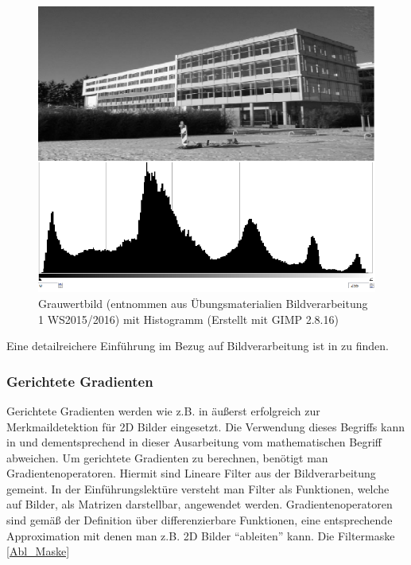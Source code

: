 \begin{figure}[thpb]
	\centering
	\includegraphics[width=\linewidth]{1-Einleitung/pics/pic_histo_uni01.png}
	\caption{Grauwertbild (entnommen aus Übungsmaterialien Bildverarbeitung 1 WS2015/2016) mit Histogramm (Erstellt mit GIMP 2.8.16)}
	\label{histo_pic}
\end{figure}



Eine detailreichere Einführung im Bezug auf Bildverarbeitung ist in \cite{Priese15} zu finden.

\subsubsection{Gerichtete Gradienten}
Gerichtete Gradienten werden wie z.B. in \cite{dalal2005histograms} äußerst erfolgreich zur Merkmaildetektion für 2D Bilder eingesetzt. Die Verwendung dieses Begriffs kann in \cite{scherer2010histograms} und dementsprechend in dieser Ausarbeitung vom mathematischen Begriff abweichen.
\newline
Um gerichtete Gradienten zu berechnen, benötigt man Gradientenoperatoren. Hiermit sind Lineare Filter aus der Bildverarbeitung gemeint. In der Einführungslektüre \cite{Priese15} versteht man Filter als Funktionen, welche auf Bilder, als Matrizen darstellbar, angewendet werden. Gradientenoperatoren sind gemäß der Definition über differenzierbare Funktionen, eine entsprechende Approximation mit denen man z.B. 2D Bilder "`ableiten"' kann. Die Filtermaske \ref{Abl_Maske} 

